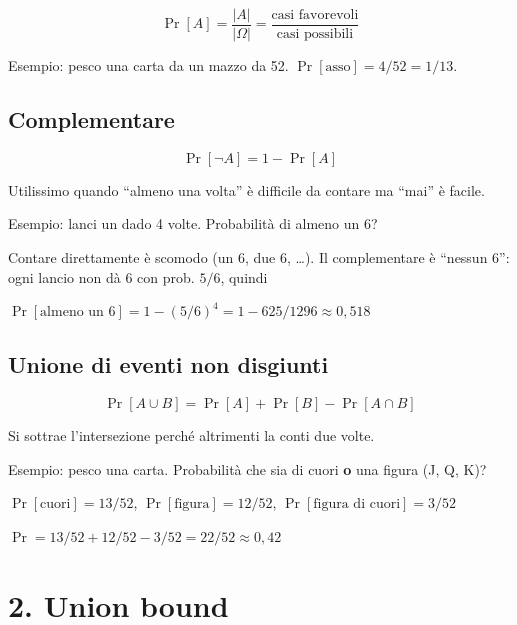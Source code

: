 \[
\Pr[A] = \frac{|A|}{|\Omega|} = \frac{\text{casi favorevoli}}{\text{casi possibili}}
\]

\begin{esempio}

Esempio: pesco una carta da un mazzo da 52. \(\Pr[\text{asso}] = 4/52 = 1/13\).

\end{esempio}

\subsection{Complementare}

\[
\Pr[\neg A] = 1 - \Pr[A]
\]

Utilissimo quando ``almeno una volta'' è difficile da contare ma ``mai'' è facile.

\begin{esempio}

Esempio: lanci un dado 4 volte. Probabilità di almeno un 6?

Contare direttamente è scomodo (un 6, due 6, \ldots). Il complementare è ``nessun 6'': ogni lancio non dà 6 con prob. \(5/6\), quindi

\(\Pr[\text{almeno un 6}] = 1 - (5/6)^4 = 1 - 625/1296 \approx 0{,}518\)

\end{esempio}

\subsection{Unione di eventi non disgiunti}

\[
\Pr[A \cup B] = \Pr[A] + \Pr[B] - \Pr[A \cap B]
\]

Si sottrae l'intersezione perché altrimenti la conti due volte.

\begin{esempio}

Esempio: pesco una carta. Probabilità che sia di cuori \textbf{o} una figura (J, Q, K)?

\(\Pr[\text{cuori}] = 13/52\), \(\Pr[\text{figura}] = 12/52\), \(\Pr[\text{figura di cuori}] = 3/52\)

\(\Pr = 13/52 + 12/52 - 3/52 = 22/52 \approx 0{,}42\)

\end{esempio}

\section{2. Union bound}


